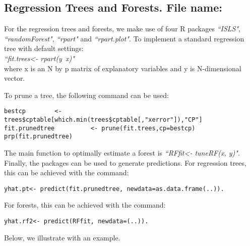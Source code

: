 \documentclass[12pt]{article}
\begin{document}
\subsection{Regression Trees and Forests. File name: \color{blue}{Tree.R, Forest.R}}

For the regression trees and forests, we make use of four R packages \emph{``ISLS"}, \emph{``randomForest"}, \emph{``rpart"} and \emph{``rpart.plot"}. To implement a standard regression tree with default settings:
\\
\emph{``fit.trees<- rpart(y~x)"}
\\
where x is an N by p matrix of explanatory variables and y is N-dimensional vector.

To prune a tree, the following command can be used:

\begin{lstlisting}[title=\textbf{Tree Pruning}]
bestcp        <- trees$cptable[which.min(trees$cptable[,"xerror"]),"CP"]
fit.prunedtree          <- prune(fit.trees,cp=bestcp)
prp(fit.prunedtree)
\end{lstlisting}

The main function to optimally estimate a forest is \emph{``RFfit<- tuneRF(x, y)"}.
Finally, the packages can be used to generate predictions. For regression trees, this can be achieved with the command:
\begin{lstlisting}[title=\textbf{Main Command}]
yhat.pt<- predict(fit.prunedtree, newdata=as.data.frame(..)).
\end{lstlisting}

For forests, this can be achieved with the command:
\begin{lstlisting}[title=\textbf{Main Command}]
yhat.rf2<- predict(RFfit, newdata=(..)).
\end{lstlisting}

Below, we illustrate with an example.
\end{document}
